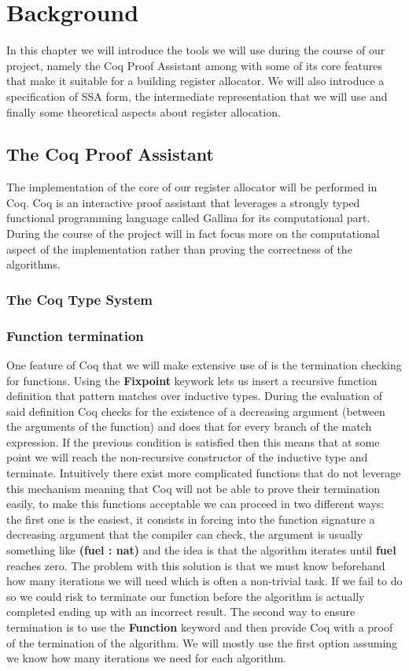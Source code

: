 \chapter{Background}
\label{cha:background}
In this chapter we will introduce the tools we will use during the course of our project, namely the Coq Proof Assistant among with some of its core features that make it suitable for a building register allocator. We will also introduce a specification of SSA form, the intermediate representation that we will use and finally some theoretical aspects about register allocation.

\section{The Coq Proof Assistant}
The implementation of the core of our register allocator will be performed in Coq. Coq is an interactive proof assistant that leverages a strongly typed functional programming language called Gallina for its computational part. 
During the course of the project will in fact focus more on the computational aspect of the implementation rather than proving the correctness of the algorithms.

\subsection{The Coq Type System}
\label{subsec:ind-coind}

\subsection{Function termination}
One feature of Coq that we will make extensive use of is the termination checking for functions. Using the \textbf{Fixpoint} keywork lets us insert a recursive function definition that pattern matches over inductive types.
During the evaluation of said definition Coq checks for the existence of a decreasing argument (between the arguments of the function) and does that for every branch of the match expression. If the previous condition is satisfied then this means that at some point we will reach the non-recursive constructor of the inductive type and terminate.
Intuitively there exist more complicated functions that do not leverage this mechanism meaning that Coq will not be able to prove their termination easily, to make this functions acceptable we can proceed in two different ways:
the first one is the easiest, it consists in forcing into the function signature a decreasing argument that the compiler can check, the argument is usually something like \textbf{(fuel : nat)} and the idea is that the algorithm iterates until \textbf{fuel} reaches zero. The problem with this solution is that we must know beforehand how many iterations we will need which is often a non-trivial task. If we fail to do so we could risk to terminate our function before the algorithm is actually completed ending up with an incorrect result.
The second way to ensure termination is to use the \textbf{Function} keyword and then provide Coq with a proof of the termination of the algorithm.
We will mostly use the first option assuming we know how many iterations we need for each algorithm.

